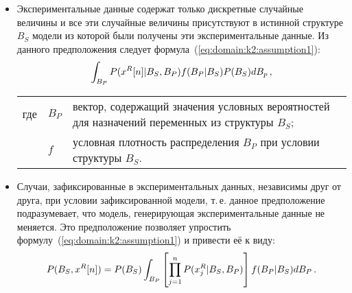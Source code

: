 \begin{itemize}
  \item 
  Экспериментальные данные содержат только дискретные случайные величины и все эти случайные величины присутствуют в истинной структуре $B_S$ модели из которой были получены эти экспериментальные данные.
  Из данного предположения следует формула~(\ref{eq:domain:k2:assumption1}):
  \begin{equation}
    \label{eq:domain:k2:assumption1}
    \int_{B_P} P(x^R[n] | B_S, B_P) f(B_P | B_S) P(B_S) dB_p \text{\,,}
  \end{equation}
  \par\hspace{\fivecharsapprox} %
  \begin{tabular}{@{}ll@{ --- }p{}}
  где & $ B_P $ & вектор, содержащий значения условных вероятностей для назначений переменных из структуры $ B_S $; \\
      & $ f $ & условная плотность распределения $B_P$ при условии структуры $B_S$. \\[\parsep]
  \end{tabular}

  \item
  Случаи, зафиксированные в экспериментальных данных, независимы друг от друга, при условии зафиксированной модели, т.\,е. данное предположение подразумевает, что модель, генерирующая экспериментальные данные не меняется.
  Это предположение позволяет упростить формулу~(\ref{eq:domain:k2:assumption1}) и привести её к виду:
  \begin{equation}
    \label{eq:domain:k2:assumption2}
    P(B_S, x^R[n]) =
      P(B_S) \int_{B_P} \left[ \prod_{j = 1}^{n} P(x^R_j | B_S, B_P) \right] f(B_P | B_S) dB_P \text{\,.}
  \end{equation}


\end{itemize}
